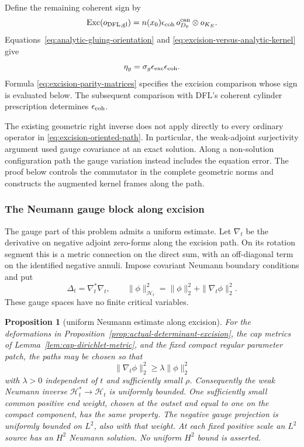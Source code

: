 \documentclass[11pt]{amsart}
\newtheorem{proposition}[theorem]{Proposition}
\theoremstyle{definition}
\theoremstyle{remark}
\theoremstyle{plain}
\begin{document}
Define the remaining coherent sign by
\[
 \operatorname{Exc}(o_{\rm DFL,gl})
       =n(x_0)\epsilon_{\rm coh}\,
                      o_{D_0}^{\rm can}\otimes o_{K_E}.
\]
Equations~\eqref{eq:analytic-gluing-orientation} and
\eqref{eq:excision-versus-analytic-kernel} give
\begin{equation}\label{eq:primitive-orientation-three-factors}
                    \eta_g=\sigma_g\epsilon_{\rm exc}
                                            \epsilon_{\rm coh}.
\end{equation}
Formula \eqref{eq:excision-parity-matrices} specifies
the excision comparison whose sign is evaluated below.
The subsequent comparison with DFL's coherent cylinder
prescription determines $\epsilon_{\rm coh}$.

The existing geometric right inverse does not apply directly
to every ordinary operator in \eqref{eq:excision-oriented-path}.
In particular, the weak-adjoint surjectivity argument used
gauge covariance at an exact solution. Along a non-solution
configuration path the gauge variation instead includes the
equation error. The proof below controls the commutator in
the complete geometric norms and constructs the augmented
kernel frames along the path.

\subsubsection{The Neumann gauge block along excision}

The gauge part of this problem admits a uniform estimate.
Let $\nabla_t$ be the derivative on negative adjoint zero-forms
along the excision path. On its rotation segment this is a
metric connection on the direct sum, with an off-diagonal term
on the identified negative annuli. Impose covariant Neumann
boundary conditions and put
\[
 \Delta_t=\nabla_t^*\nabla_t,\qquad
 \|\phi\|_{\mathcal H_t}^2=\|\phi\|_2^2+\|\nabla_t\phi\|_2^2.
\]
These gauge spaces have no finite critical variables.

\begin{proposition}[uniform Neumann estimate along excision]
\label{prop:excision-neumann-gap}
For the deformations in
Proposition~\ref{prop:actual-determinant-excision},
the cap metrics of Lemma~\ref{lem:cap-dirichlet-metric},
and the fixed compact regular parameter patch, the paths may be
chosen so that
\begin{equation}\label{eq:excision-neumann-gap}
       \|\nabla_t\phi\|_2^2\geq\lambda\|\phi\|_2^2
\end{equation}
with $\lambda>0$ independent of $t$ and sufficiently small $\rho$.
Consequently the weak Neumann inverse
$\mathcal H_t^*\to\mathcal H_t$ is uniformly bounded.
One sufficiently small common positive end weight, chosen at
the outset and equal to one on the compact component, has the
same property. The negative gauge projection is uniformly
bounded on $L^2$, also with that weight.
At each fixed positive scale an $L^2$ source
has an $H^2$ Neumann solution. No uniform $H^2$ bound is asserted.
\end{proposition}
\end{document}
